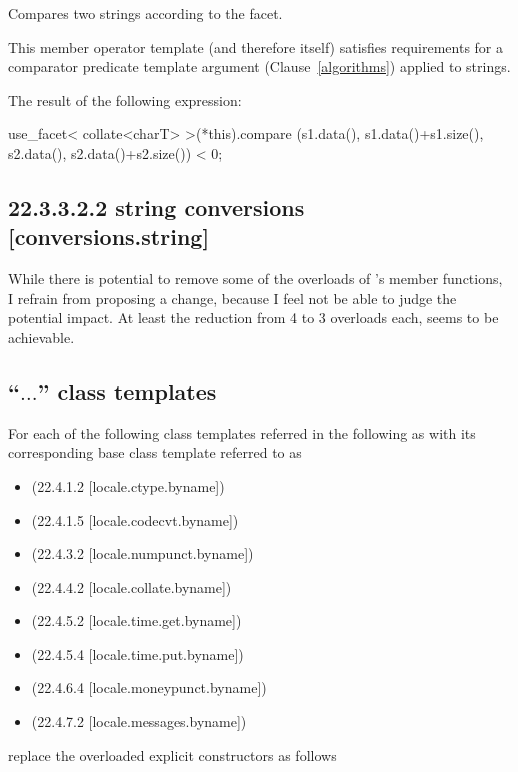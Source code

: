 \documentclass[ebook,11pt,article]{memoir}
\begin{document}
\begin{itemdescr}
\pnum
\effects
Compares two strings according to the
facet.

\pnum
\remarks
This member operator template (and therefore
itself) satisfies requirements for a comparator predicate template argument
(Clause~\ref{algorithms}) applied to strings.

\pnum
\returns
The result of the following expression:

\begin{codeblock}
use_facet< collate<charT> >(*this).compare
  (s1.data(), s1.data()+s1.size(), s2.data(), s2.data()+s2.size()) < 0;
\end{codeblock}
\end{itemdescr}

\subsection{22.3.3.2.2 string conversions [conversions.string]}
While there is potential to remove some of the overloads of 's member functions, I refrain from proposing a change, because I feel not be able to judge the potential impact. At least the reduction from 4 to 3 overloads each, seems to be achievable.

\subsection{ ``$\ldots$'' class templates }
For each of the following class templates referred in the following as  with its corresponding base class template referred to as 
\begin{itemize}
\item {} (22.4.1.2 [locale.ctype.byname])
\item {} (22.4.1.5 [locale.codecvt.byname])
\item {} (22.4.3.2 [locale.numpunct.byname])
\item {} (22.4.4.2 [locale.collate.byname])
\item {} (22.4.5.2 [locale.time.get.byname])
\item {} (22.4.5.4 [locale.time.put.byname])
\item {} (22.4.6.4 [locale.moneypunct.byname])
\item {} (22.4.7.2 [locale.messages.byname])
\end{itemize}
replace the overloaded explicit constructors as follows
\end{document}
